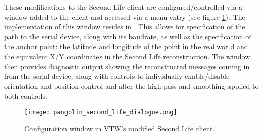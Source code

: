 These modifications to the Second Life client are configured/controlled via a window added to the client and accessed via a menu entry (see figure \ref{pangolin_second_life_dialogue.png}). The implementation of this window resides in . This allows for specification of the path to the serial device, along with its baudrate, as well as the specification of the anchor point: the latitude and longitude of the point in the real world and the equivalent X/Y coordinates in the Second Life reconstruction. The window then provides diagnostic output showing the reconstructed messages coming in from the serial device, along with controls to individually enable/disable orientation and position control and alter the high-pass and smoothing applied to both controls.

\begin{figure}[h]
\centering
  \texttt{[image: pangolin\_second\_life\_dialogue.png]}
  \caption{Configuration window in VTW's modified Second Life client.}
  \label{pangolin_second_life_dialogue.png}
\end{figure}

